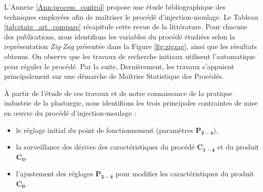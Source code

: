 \noindent
L'Annexe \ref{Ann:process_control} propose une étude bibliographique des techniques employées afin de maîtriser le procédé d'injection-moulage.
Le Tableau \ref{tab:state_art_compare} récapitule cette revue de la littérature.
Pour chacune des publications, nous identifions les variables du procédé étudiées selon la représentation \textit{Zig-Zag} présentée dans la Figure \ref{fig:zigzag}, ainsi que les résultats obtenus.
On observe que les travaux de recherche initiaux utilisent l'automatique pour réguler le procédé.
Par la suite, 
Dernièrement, les travaux s'appuient principalement sur une démarche de Maîtrise Statistique des Procédés.  %

À partir de l'étude de ces travaux et de notre connaissance de la pratique industrie de la plasturgie, nous identifions les trois principales contraintes de mise en œuvre du procédé d'injection-moulage :
\begin{itemize}
	\item le réglage initial du point de fonctionnement (paramètres $\boldsymbol{P_{2-4}}$),
	\item la surveillance des dérives des caractéristiques du procédé $\boldsymbol{C_{1-4}}$ et du produit $\boldsymbol{C_{0}}$.
	\item l'ajustement des réglages $\boldsymbol{P_{2-4}}$ pour modifier les caractéristiques du produit $\boldsymbol{C_{0}}$.
\end{itemize}

